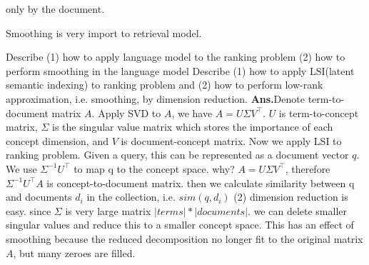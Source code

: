 \documentclass[11pt]{exam}
\newcommand{\ans}{\textbf{Ans.}}
\begin{document}
\begin{questions}
\begin{subparts}
only by the document.
  \end{subparts}
  \question Smoothing is very import to retrieval model.
  \begin{subparts}
  \subpart Describe (1) how to apply language model to the ranking problem (2) how to perform smoothing in the language model
  \subpart Describe (1) how to apply LSI(latent semantic indexing) to ranking problem and (2) how to perform low-rank approximation, i.e. smoothing, by dimension reduction.
  \ans Denote term-to-document matrix $A$. Apply SVD to $A$, we have $A=U\Sigma V^\top$. $U$ is term-to-concept matrix, $\Sigma$ is the singular value matrix which stores the importance of each concept dimension, and $V$ is document-concept matrix. Now we apply LSI to ranking problem. Given a query, this can be represented as a document vector $q$. We use $\Sigma^{-1}U^\top$ to map q to the concept space. why? $A=U\Sigma V^\top$, therefore $\Sigma^{-1}U^\top A$ is concept-to-document matrix. then we calculate similarity between q and documents $d_i$ in the collection, i.e. $sim(q,d_i)$ (2) dimension reduction is easy. since $\Sigma$ is very large matrix $|terms|*|documents|$. we can delete smaller singular values and reduce this to a smaller concept space. This has an effect of smoothing because the reduced decomposition no longer fit to the original matrix $A$, but many zeroes are filled.
  \end{subparts}
\end{questions}
\end{document}
